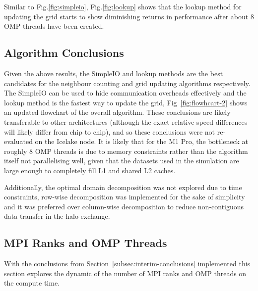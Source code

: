 Similar to Fig.\eqref{fig:simpleio}, Fig.\eqref{fig:lookup} shows that the lookup method for updating the grid starts
to show diminishing returns in performance after about 8 OMP threads have been created.

\subsection{Algorithm Conclusions}\label{subsec:interim-conclusions}
Given the above results, the SimpleIO and lookup methods are the best candidates for the neighbour counting and grid
updating algorithms respectively.
The SimpleIO can be used to hide communication overheads effectively and the lookup method is the fastest way to
update the grid, Fig~\eqref{fig:flowhcart-2} shows an updated flowchart of the overall algorithm.
These conclusions are likely transferable to other architectures (although the exact relative speed differences will
likely differ from chip to chip), and so these conclusions were not re-evaluated on the Icelake node.
It is likely that for the M1 Pro, the bottleneck at roughly 8 OMP threads is due to memory constraints rather
than the algorithm itself not parallelising well, given that the datasets used in the simulation are large enough
to completely fill L1 and shared L2 caches.

Additionally, the optimal domain decomposition was not explored due to time constraints, row-wise decomposition was implemented
for the sake of simplicity and it was preferred over column-wise decomposition to reduce non-contiguous data transfer
in the halo exchange.

\subsection{MPI Ranks and OMP Threads}\label{subsec:mpi-omp}
With the conclusions from Section~\eqref{subsec:interim-conclusions} implemented this section explores the dynamic of
the number of MPI ranks and OMP threads on the compute time.

